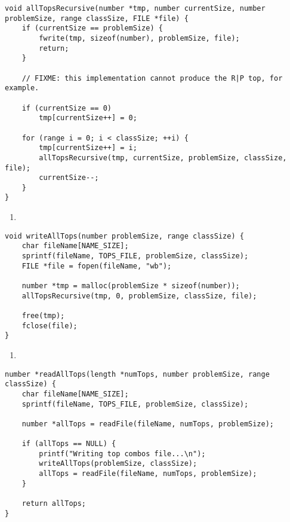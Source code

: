 \begin{lstlisting}[caption={},label={allTopsRecursive}]
void allTopsRecursive(number *tmp, number currentSize, number problemSize, range classSize, FILE *file) {
    if (currentSize == problemSize) {
        fwrite(tmp, sizeof(number), problemSize, file);
        return;
    }

    // FIXME: this implementation cannot produce the R|P top, for example.

    if (currentSize == 0)
        tmp[currentSize++] = 0;

    for (range i = 0; i < classSize; ++i) {
        tmp[currentSize++] = i;
        allTopsRecursive(tmp, currentSize, problemSize, classSize, file);
        currentSize--;
    }
}
\end{lstlisting}

\begin{enumerate}
\addtocounter{enumi}{1}
\item 
\end{enumerate}

\begin{lstlisting}[caption={},label={writeAllTops}]
void writeAllTops(number problemSize, range classSize) {
    char fileName[NAME_SIZE];
    sprintf(fileName, TOPS_FILE, problemSize, classSize);
    FILE *file = fopen(fileName, "wb");

    number *tmp = malloc(problemSize * sizeof(number));
    allTopsRecursive(tmp, 0, problemSize, classSize, file);

    free(tmp);
    fclose(file);
}
\end{lstlisting}

\begin{enumerate}
\addtocounter{enumi}{1}
\item 
\end{enumerate}

\begin{lstlisting}[caption={},label={readAllTops}]
number *readAllTops(length *numTops, number problemSize, range classSize) {
    char fileName[NAME_SIZE];
    sprintf(fileName, TOPS_FILE, problemSize, classSize);

    number *allTops = readFile(fileName, numTops, problemSize);

    if (allTops == NULL) {
        printf("Writing top combos file...\n");
        writeAllTops(problemSize, classSize);
        allTops = readFile(fileName, numTops, problemSize);
    }

    return allTops;
}
\end{lstlisting}


